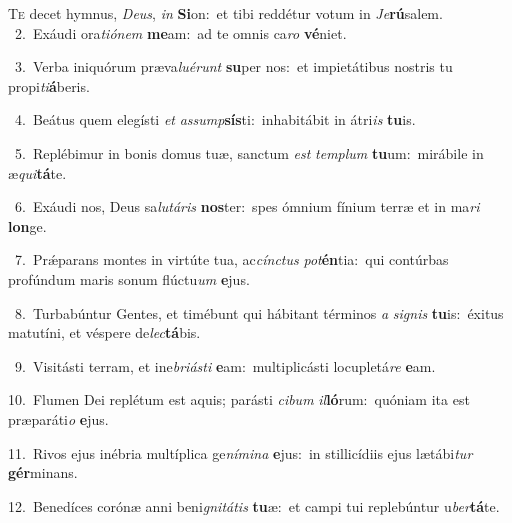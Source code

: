 \lettrine{\initial\textcolor{\initialcolor}{T}}{e} decet hymnus, \textit{De}\-\textit{us}, \textit{in} \textbf{Si}\-on:~\star et tibi reddétur votum in \textit{Je}\-\textbf{rú}salem.\\
{\numbfont\textcolor{\numbcolor}{~2.}}~Exáudi ora\-\textit{ti}\-\textit{ó}\textit{nem} \textbf{me}\-am:~\star ad te omnis ca\textit{ro} \textbf{vé}\-niet.\par
{\numbfont\textcolor{\numbcolor}{~3.}}~Verba iniquórum præva\-\textit{lu}\-\textit{é}\textit{runt} \textbf{su}\-per nos:~\star et impietátibus nostris tu propi\-\textit{ti}\-\textbf{á}beris.\par
{\numbfont\textcolor{\numbcolor}{~4.}}~Beátus quem elegísti \textit{et} \textit{as}\-\textit{sump}\textbf{sís}ti:~\star inhabitábit in átri\textit{is} \textbf{tu}\-is.\par
{\numbfont\textcolor{\numbcolor}{~5.}}~Replébimur in bonis domus tuæ, sanctum \textit{est} \textit{tem}\-\textit{plum} \textbf{tu}\-um:~\star mirábile in æ\-\textit{qui}\-\textbf{tá}te.\par
{\numbfont\textcolor{\numbcolor}{~6.}}~Exáudi nos, Deus sa\-\textit{lu}\-\textit{tá}\textit{ris} \textbf{nos}\-ter:~\star spes ómnium fínium terræ et in ma\textit{ri} \textbf{lon}\-ge.\par
{\numbfont\textcolor{\numbcolor}{~7.}}~Prǽparans montes in virtúte tua, ac\-\textit{cínc}\-\textit{tus} \textit{pot}\-\textbf{én}tia:~\star qui contúrbas profúndum maris sonum flúctu\textit{um} \textbf{e}\-jus.\par
{\numbfont\textcolor{\numbcolor}{~8.}}~Turbabúntur Gentes, et timébunt qui hábitant términos \textit{a} \textit{si}\-\textit{gnis} \textbf{tu}\-is:~\star éxitus matutíni, et véspere de\-\textit{lec}\-\textbf{tá}bis.\par
{\numbfont\textcolor{\numbcolor}{~9.}}~Visitásti terram, et ine\-\textit{bri}\-\textit{ás}\textit{ti} \textbf{e}\-am:~\star multiplicásti locupletá\textit{re} \textbf{e}\-am.\par
{\numbfont\textcolor{\numbcolor}{10.}}~Flumen Dei replétum est aquis; parásti \textit{ci}\-\textit{bum} \textit{il}\-\textbf{ló}rum:~\star quóniam ita est præparáti\textit{o} \textbf{e}\-jus.\par
{\numbfont\textcolor{\numbcolor}{11.}}~Rivos ejus inébria multíplica ge\-\textit{ní}\-\textit{mi}\textit{na} \textbf{e}\-jus:~\star in stillicídiis ejus lætábi\textit{tur} \textbf{gér}\-minans.\par
{\numbfont\textcolor{\numbcolor}{12.}}~Benedíces corónæ anni beni\-\textit{gni}\-\textit{tá}\textit{tis} \textbf{tu}\-æ:~\star et campi tui replebúntur u\-\textit{ber}\-\textbf{tá}te.\par
